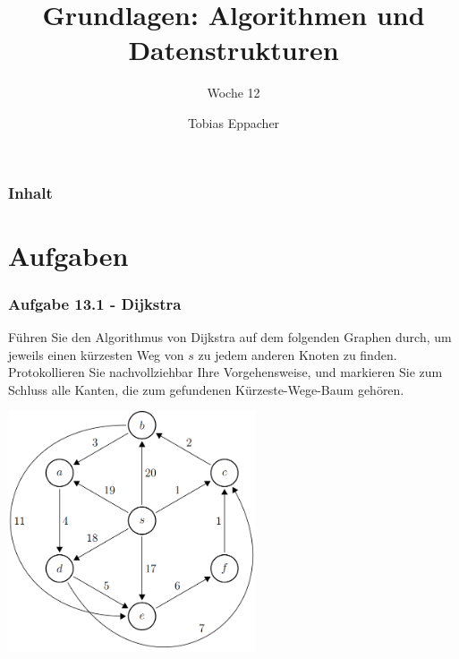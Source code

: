 \documentclass{beamer}
\title{Grundlagen: Algorithmen und Datenstrukturen}
\author{Tobias Eppacher}
\date{\presdatum}
\institute{School of Computation, Information and Technology}
\subtitle{Woche 12}
\begin{document}
\begin{frame}
	\titlepage
\end{frame}

\begin{frame}
	\frametitle{Inhalt}
	\tableofcontents[subsectionstyle=hide]
\end{frame}

\section{Aufgaben}

\begin{frame}
	\frametitle{Aufgabe 13.1 - Dijkstra}
	\scriptsize
	Führen Sie den Algorithmus von Dijkstra auf dem folgenden Graphen durch, um jeweils einen
	kürzesten Weg von $s$ zu jedem anderen Knoten zu finden. Protokollieren Sie nachvollziehbar Ihre Vorgehensweise, und markieren Sie zum Schluss alle Kanten, die zum gefundenen
	Kürzeste-Wege-Baum gehören.
	\begin{center}
		\includegraphics[width=0.55\textwidth]{images/dijkstra.png}
	\end{center}
\end{frame}
\end{document}
